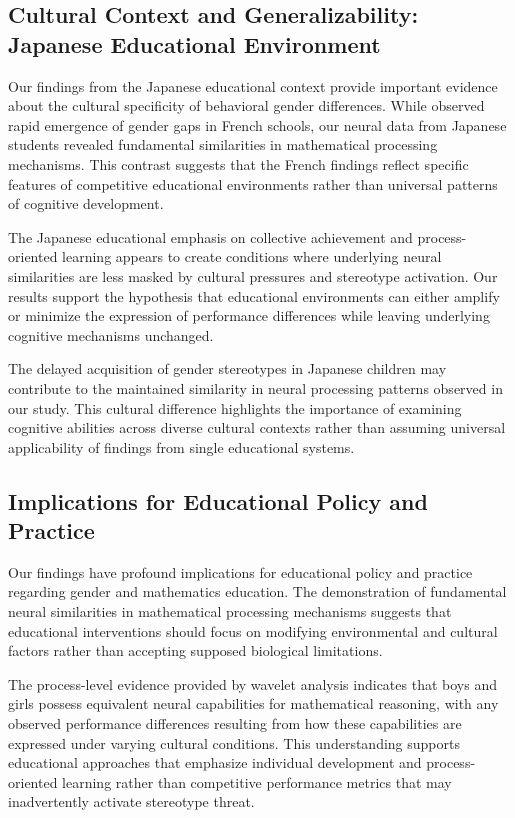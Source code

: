 \documentclass[pdflatex,sn-nature]{sn-jnl}%
\theoremstyle{thmstyleone}%
\theoremstyle{thmstyletwo}%
\theoremstyle{thmstylethree}%
\begin{document}
\subsection{Cultural Context and Generalizability: Japanese Educational Environment}
Our findings from the Japanese educational context provide important evidence about the cultural specificity of behavioral gender differences. While \cite{martinot2025mathematical} observed rapid emergence of gender gaps in French schools, our neural data from Japanese students revealed fundamental similarities in mathematical processing mechanisms. This contrast suggests that the French findings reflect specific features of competitive educational environments rather than universal patterns of cognitive development.

The Japanese educational emphasis on collective achievement and process-oriented learning appears to create conditions where underlying neural similarities are less masked by cultural pressures and stereotype activation. Our results support the hypothesis that educational environments can either amplify or minimize the expression of performance differences while leaving underlying cognitive mechanisms unchanged.

The delayed acquisition of gender stereotypes in Japanese children \cite{tatsuno2022development} may contribute to the maintained similarity in neural processing patterns observed in our study. This cultural difference highlights the importance of examining cognitive abilities across diverse cultural contexts rather than assuming universal applicability of findings from single educational systems.


\subsection{Implications for Educational Policy and Practice}
Our findings have profound implications for educational policy and practice regarding gender and mathematics education. The demonstration of fundamental neural similarities in mathematical processing mechanisms suggests that educational interventions should focus on modifying environmental and cultural factors rather than accepting supposed biological limitations.

The process-level evidence provided by wavelet analysis indicates that boys and girls possess equivalent neural capabilities for mathematical reasoning, with any observed performance differences resulting from how these capabilities are expressed under varying cultural conditions. This understanding supports educational approaches that emphasize individual development and process-oriented learning rather than competitive performance metrics that may inadvertently activate stereotype threat.
\end{document}
